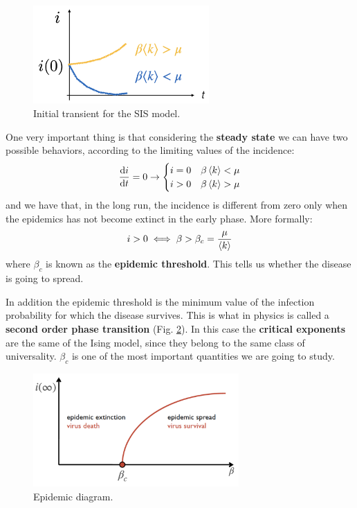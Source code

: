 \documentclass[../main/main.tex]{subfiles}
\begin{document}
\begin{figure}[h!]
\centering
\includegraphics[width=0.6\textwidth]{../lessons/image/03/4.png}
\caption{\label{fig:3_4} Initial transient for the SIS model.}
\end{figure}

One very important thing is that considering the \textbf{steady state} we can have two possible behaviors, according to the limiting values of the incidence:
\begin{equation*}
  \dv{i}{t} = 0 \rightarrow  \begin{cases}
   i=0 & \beta \expval{k} < \mu  \\
   i>0 & \beta \expval{k} > \mu
  \end{cases}
\end{equation*}
and we have that, in the long run, the incidence is different from zero only when the epidemics has not become extinct in the early phase. More formally:
\begin{equation}
  i>0 \iff \beta > \beta_c = \frac{\mu }{ \expval{k} }
\end{equation}
where $\beta_c$ is known as the \textbf{epidemic threshold}. This tells us whether the disease is going to spread.

In addition the epidemic threshold is the minimum value of the infection probability for which the disease survives. This is what in physics is called a \textbf{second order phase transition} (Fig. \ref{fig:3_5}). In this case the \textbf{critical exponents} are the same of the Ising model, since they belong to the same class of universality. $\beta_c$ is one of the most important quantities we are going to study.

\begin{figure}[h!]
\centering
\includegraphics[width=0.7\textwidth]{../lessons/image/03/5.png}
\caption{\label{fig:3_5} Epidemic diagram.}
\end{figure}
\end{document}
